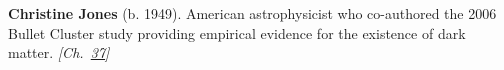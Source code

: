 \textbf{Christine Jones} (b. 1949). American astrophysicist who co-authored the 2006 Bullet Cluster study providing empirical evidence for the existence of dark matter. \emph{[Ch.~\hyperref[ch:darkmatterevidence]{37}]}

